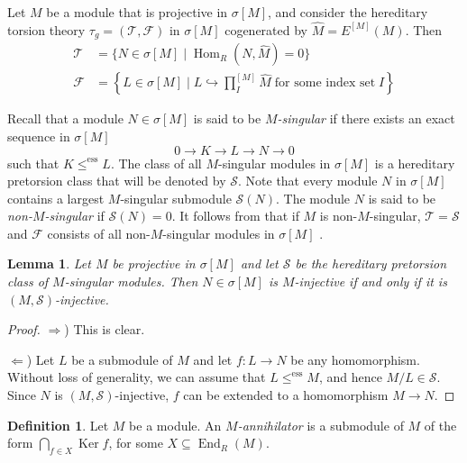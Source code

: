 \documentclass{amsart}
\newtheorem{lemma}[thm]{Lemma}
\theoremstyle{definition}
\newtheorem{defn}[thm]{Definition}
\theoremstyle{remark}
\numberwithin{equation}{section}
\DeclareMathOperator{\Ker}{Ker}
\DeclareMathOperator{\Hom}{Hom}
\DeclareMathOperator{\End}{End}
\newcommand{\sm}{\sigma[M]}
\newcommand{\ess}{\leq^\text{ess}}
\begin{document}
	Let $M$ be a module that is projective in $\sm$,
	and consider the hereditary torsion theory 
	$\tau_g=(\mathcal{T},\mathcal{F})$ in $\sm$ 
	cogenerated by $\widehat{M}=E^{[M]}(M)$. 
	Then
	\begin{equation}\label{12}
		\begin{split}
			\mathcal{T}& =\{N\in\sm\mid \Hom_R(N,\widehat{M})=0\} \\
			\mathcal{F}& =\left\lbrace L\in\sm\mid L\hookrightarrow 
			\textstyle{\prod_I^{[M]}\widehat{M}}\;
			\text{for some index set}\;I\right\rbrace 
		\end{split}
	\end{equation}
	
	Recall that a module $N\in\sm$ is said to be \emph{$M$-singular} 
	if there exists an exact sequence in $\sm$
	\[0\to K\to L\to N\to 0\]
	such that $K\ess L$. 
	The class of all $M$-singular modules in $\sm$ 
	is a hereditary pretorsion class that will be denoted by $\mathcal{S}$. 
	Note that every module $N$ in $\sm$ 
	contains a largest $M$-singular submodule $\mathcal{S}(N)$. 
	The module $N$ is said to be \emph{non-$M$-singular} if $\mathcal{S}(N)=0$. 
	It follows from \cite[10.2]{wisbauermodules} that if $M$ is non-$M$-singular, $\mathcal{T}=\mathcal{S}$ and $\mathcal{F}$ 
	consists of all non-$M$-singular modules in $\sm$ .
	
	\begin{lemma}\label{injtg}
		Let $M$ be projective in $\sm$ 
		and let $\mathcal{S}$ be the 
		hereditary pretorsion class of $M$-singular modules. 
		Then $N\in\sm$ is $M$-injective 
		if and only if 
		it is $(M,\mathcal{S})$-injective.
	\end{lemma}
	
	\begin{proof}
		$\Rightarrow$)
		This is clear.
		
		$\Leftarrow$)
		Let $L$ be a submodule of $M$ and let $f:L\to N$ be any homomorphism. 
		Without loss of generality, we can assume that $L\ess M$, 
		and hence $M/L\in \mathcal{S}$. 
		Since $N$ is $(M,\mathcal{S})$-injective, 
		$f$ can be extended to a homomorphism $M\to N$.
	\end{proof}
	
	\begin{defn}
		Let $M$ be a module. 
		An \emph{$M$-annihilator} is a submodule of $M$ 
		of the form $\bigcap_{f\in X}\Ker f$, for some $X\subseteq\End_R(M)$.
	\end{defn}
	
\end{document}
